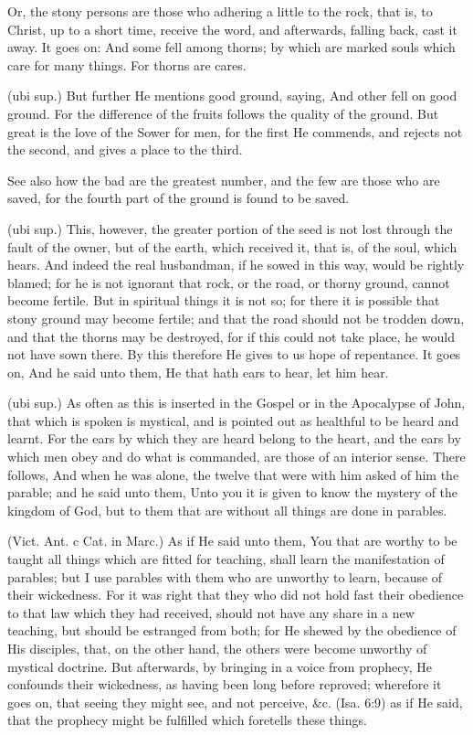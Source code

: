  Or, the stony persons are those who adhering a little to the rock, that is, to Christ, up to a short time, receive the word, and afterwards, falling back, cast it away. It goes on: And some fell among thorns; by which are marked souls which care for many things. For thorns are cares.

 (ubi sup.) But further He mentions good ground, saying, And other fell on good ground. For the difference of the fruits follows the quality of the ground. But great is the love of the Sower for men, for the first He commends, and rejects not the second, and gives a place to the third.

 See also how the bad are the greatest number, and the few are those who are saved, for the fourth part of the ground is found to be saved.

 (ubi sup.) This, however, the greater portion of the seed is not lost through the fault of the owner, but of the earth, which received it, that is, of the soul, which hears. And indeed the real husbandman, if he sowed in this way, would be rightly blamed; for he is not ignorant that rock, or the road, or thorny ground, cannot become fertile. But in spiritual things it is not so; for there it is possible that stony ground may become fertile; and that the road should not be trodden down, and that the thorns may be destroyed, for if this could not take place, he would not have sown there. By this therefore He gives to us hope of repentance. It goes on, And he said unto them, He that hath ears to hear, let him hear.

 (ubi sup.) As often as this is inserted in the Gospel or in the Apocalypse of John, that which is spoken is mystical, and is pointed out as healthful to be heard and learnt. For the ears by which they are heard belong to the heart, and the ears by which men obey and do what is commanded, are those of an interior sense. There follows, And when he was alone, the twelve that were with him asked of him the parable; and he said unto them, Unto you it is given to know the mystery of the kingdom of God, but to them that are without all things are done in parables.

 (Vict. Ant. c Cat. in Marc.) As if He said unto them, You that are worthy to be taught all things which are fitted for teaching, shall learn the manifestation of parables; but I use parables with them who are unworthy to learn, because of their wickedness. For it was right that they who did not hold fast their obedience to that law which they had received, should not have any share in a new teaching, but should be estranged from both; for He shewed by the obedience of His disciples, that, on the other hand, the others were become unworthy of mystical doctrine. But afterwards, by bringing in a voice from prophecy, He confounds their wickedness, as having been long before reproved; wherefore it goes on, that seeing they might see, and not perceive, \&c. (Isa. 6:9) as if He said, that the prophecy might be fulfilled which foretells these things.

